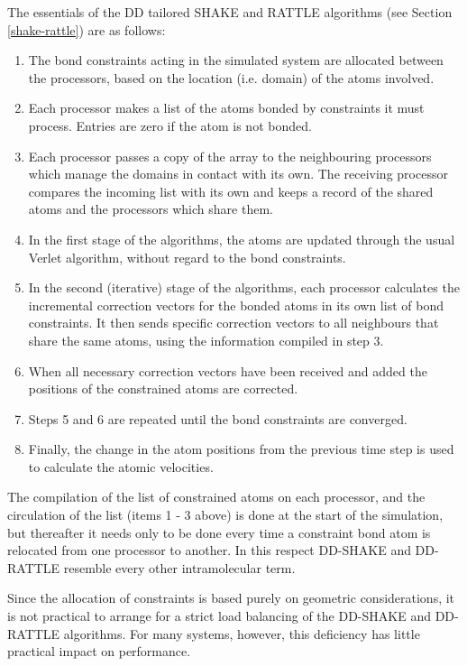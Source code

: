 The essentials of the DD tailored SHAKE and
RATTLE algorithms (see Section
\ref{shake-rattle}) are as follows:
\begin{enumerate}
\item The bond constraints acting in the simulated system are allocated
between the processors, based on the location (i.e. domain) of
the atoms involved.
\item Each processor makes a list of the atoms bonded by
constraints it must process. Entries are zero
if the atom is not bonded.
\item Each processor passes a copy of the array to the neighbouring
processors which manage the domains in contact with its own.
The receiving processor compares the incoming list with its own and
keeps a record of the shared atoms and the processors which share
them.
\item In the first stage of the algorithms, the atoms
are updated through the usual Verlet
algorithm, without regard to the bond
constraints.
\item In the second (iterative) stage of the algorithms, each
processor calculates the incremental correction vectors for the
bonded atoms in its own list of bond
constraints.  It then sends specific correction vectors to all
neighbours that share the same atoms, using the information
compiled in step 3.
\item When all necessary correction vectors have been received and
added the positions of the constrained atoms are corrected.
\item Steps 5 and 6 are repeated until the bond constraints are
converged.
\item Finally, the change in the atom positions from the previous
time step is used to calculate the atomic velocities.
\end{enumerate}

The compilation of the list of constrained atoms on each
processor, and the circulation of the list (items 1 - 3 above) is
done at the start of the simulation, but thereafter it needs only
to be done every time a constraint bond atom is relocated from one
processor to another.  In this respect DD-SHAKE and DD-RATTLE
resemble every other intramolecular term.

Since the allocation of constraints is based purely on geometric
considerations, it is not practical to arrange for a strict load
balancing of the DD-SHAKE and DD-RATTLE algorithms.  For many
systems, however, this deficiency has little practical impact on
performance.

